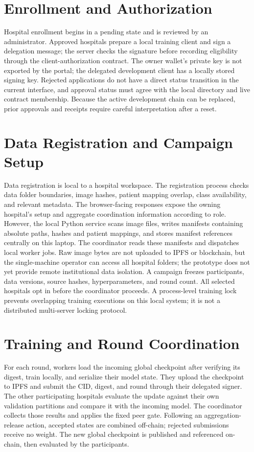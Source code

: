 \documentclass[12pt,a4paper]{report}
\begin{document}
\section{Enrollment and Authorization}
Hospital enrollment begins in a pending state and is reviewed by an administrator. Approved hospitals prepare a local training client and sign a delegation message; the server checks the signature before recording eligibility through the client-authorization contract. The owner wallet's private key is not exported by the portal; the delegated development client has a locally stored signing key. Rejected applications do not have a direct status transition in the current interface, and approval status must agree with the local directory and live contract membership. Because the active development chain can be replaced, prior approvals and receipts require careful interpretation after a reset.

\section{Data Registration and Campaign Setup}
Data registration is local to a hospital workspace. The registration process checks data folder boundaries, image hashes, patient mapping overlap, class availability, and relevant metadata. The browser-facing responses expose the owning hospital's setup and aggregate coordination information according to role. However, the local Python service scans image files, writes manifests containing absolute paths, hashes and patient mappings, and stores manifest references centrally on this laptop. The coordinator reads these manifests and dispatches local worker jobs. Raw image bytes are not uploaded to IPFS or blockchain, but the single-machine operator can access all hospital folders; the prototype does not yet provide remote institutional data isolation. A campaign freezes participants, data versions, source hashes, hyperparameters, and round count. All selected hospitals opt in before the coordinator proceeds. A process-level training lock prevents overlapping training executions on this local system; it is not a distributed multi-server locking protocol.

\section{Training and Round Coordination}
For each round, workers load the incoming global checkpoint after verifying its digest, train locally, and serialize their model state. They upload the checkpoint to IPFS and submit the CID, digest, and round through their delegated signer. The other participating hospitals evaluate the update against their own validation partitions and compare it with the incoming model. The coordinator collects those results and applies the fixed peer gate. Following an aggregation-release action, accepted states are combined off-chain; rejected submissions receive no weight. The new global checkpoint is published and referenced on-chain, then evaluated by the participants.
\end{document}
